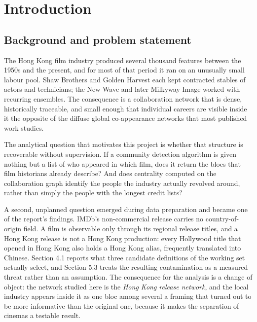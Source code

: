 
\section{Introduction}

\subsection{Background and problem statement}

The Hong Kong film industry produced several thousand features between the 1950s and the present, and for most of that period it ran on an unusually small labour pool. Shaw Brothers and Golden Harvest each kept contracted stables of actors and technicians; the New Wave and later Milkyway Image worked with recurring ensembles. The consequence is a collaboration network that is dense, historically traceable, and small enough that individual careers are visible inside it \textemdash{} the opposite of the diffuse global co-appearance networks that most published work studies.

The analytical question that motivates this project is whether that structure is recoverable without supervision. If a community detection algorithm is given nothing but a list of who appeared in which film, does it return the blocs that film historians already describe? And does centrality computed on the collaboration graph identify the people the industry actually revolved around, rather than simply the people with the longest credit lists?

A second, unplanned question emerged during data preparation and became one of the report's findings. IMDb's non-commercial release carries no country-of-origin field. A film is observable only through its regional release titles, and a Hong Kong release is not a Hong Kong production: every Hollywood title that opened in Hong Kong also holds a Hong Kong alias, frequently translated into Chinese. Section 4.1 reports what three candidate definitions of the working set actually select, and Section 5.3 treats the resulting contamination as a measured threat rather than an assumption. The consequence for the analysis is a change of object: the network studied here is the \emph{Hong Kong release network}, and the local industry appears inside it as one bloc among several \textemdash{} a framing that turned out to be more informative than the original one, because it makes the separation of cinemas a testable result.

